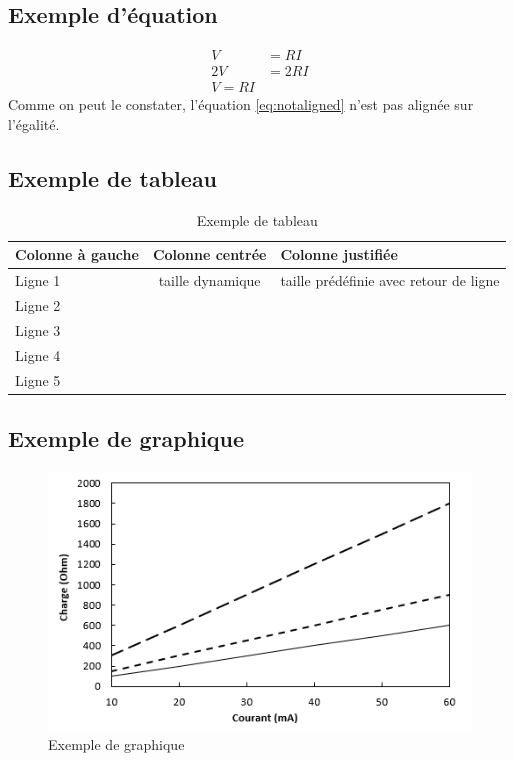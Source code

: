 \subsection{Exemple d'équation}
  \begin{align}
    V &= RI \\
    2V &= 2RI \\
    V = RI \label{eq:notaligned}
  \end{align}
Comme on peut le constater, l'équation \ref{eq:notaligned} n'est pas alignée sur l'égalité.

\subsection{Exemple de tableau}
  \begin{table}[H]
    \begin{center}
      \caption{Exemple de tableau}
      \begin{tabular}{l | c p{3cm}} 
        \hline
        \textbf{Colonne à gauche} & \textbf{Colonne centrée} & \textbf{Colonne justifiée} \\ [0.75ex] 
        \hline\hline
        Ligne 1 & taille dynamique & taille prédéfinie avec retour de ligne\\
        Ligne 2 & & \\
        Ligne 3 & & \\
        Ligne 4 & & \\
        Ligne 5 & & \\ [1ex]
        \hline
      \end{tabular}
    \end{center}
  \end{table}

\subsection{Exemple de graphique}
  \begin{figure}[H]
    \centering
    \includegraphics[scale=1]{Images/Graph.png}
    \caption{Exemple de graphique}
    \label{fig:Graph}
  \end{figure}

